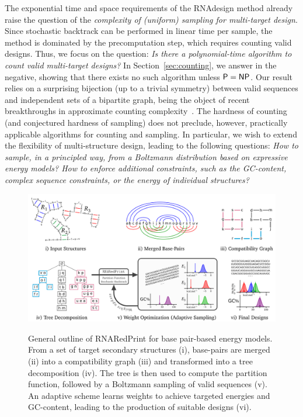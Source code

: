 \documentclass{bioinfo}
\newcommand{\Def}[1]{{\it #1}}
\newcommand{\parHead}[1]{\Final{\paragraph{#1}}}
\newcommand{\Final}[1]{#1}
\renewcommand{\Final}[1]{}
\newcommand{\Nuc}[1]{{\sf #1}}
\newcommand{\Cb}{\Nuc{C}}
\newcommand{\Gb}{\Nuc{G}}
\newcommand{\GCb}{\Gb\Cb}
\newcommand{\Software}[1]{{\ttfamily #1}}
\newcommand{\ourprog}{\Software{RNARedPrint}}
\begin{document}
\parHead{Motivation.} The exponential time and space requirements of the \Software{RNAdesign} method already raise the question of the \Def{complexity of (uniform) sampling for multi-target design}. Since stochastic backtrack can be performed in linear time per sample, the method is dominated by the precomputation step, which requires counting valid designs. Thus, we focus on the question: \emph{Is there a polynomial-time algorithm to count valid multi-target designs?} In Section~\ref{sec:counting}, we answer in the negative, showing that there exists no such algorithm unless ${\sf P}={\sf NP}$. Our result relies on a surprising bijection (up to a trivial symmetry) between valid sequences  and independent sets of a bipartite graph, being the object of recent breakthroughs in approximate counting complexity~\cite{Bulatov2013,Cai2016}.
The hardness of counting (and conjectured hardness of sampling) does not preclude, however, practically applicable algorithms for counting and sampling. In particular, we wish to extend the flexibility of multi-structure design, leading to the following questions: \emph{How to sample, in a principled way, from a Boltzmann distribution based on expressive energy models? How to enforce additional constraints, such as the \GCb-content, complex sequence constraints, or the energy of individual structures?} 


\begin{figure}[t]
{\centering\includegraphics[width=.8\textwidth]{Figs/Workflow}\\}
\caption{General outline of \ourprog{} for base pair-based energy models. From a set of target secondary structures (i), base-pairs are merged (ii) into a compatibility graph (iii) and transformed into a tree decomposition (iv). The tree is then used to compute the partition function, followed by a Boltzmann sampling of valid sequences (v). An adaptive scheme learns weights to achieve targeted energies and \GCb-content, leading to the production of suitable designs (vi).}
\label{fig:workflow}
\end{figure}
\end{document}
